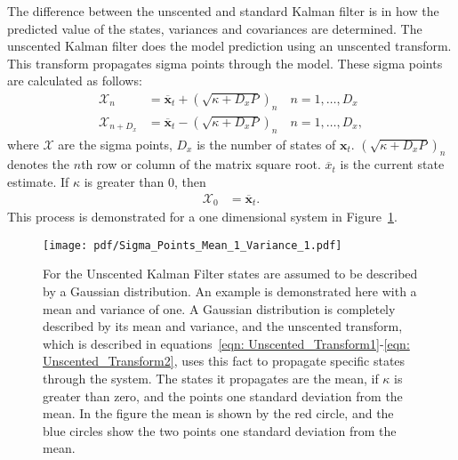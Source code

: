 The difference between the unscented and standard Kalman filter is in how the predicted value of the states, variances and covariances are determined. The unscented Kalman filter does the model prediction using an unscented transform. This transform propagates sigma points through the model. These sigma points are calculated as follows: \begin{align}
\label{eqn: Unscented_Transform1}
\mathbf{\mathcal{X}}_{n} &= \mathbf{\overline{x}}_{t} + (\sqrt{\kappa+D_{x}P})_{n} \quad n=1,\hdots,D_x\\
\label{eqn: Unscented_Transform2}
\mathbf{\mathcal{X}}_{n+D_{x}} &= \mathbf{\overline{x}}_{t} - (\sqrt{\kappa+D_{x}P})_{n} \quad n=1,\hdots,D_x,
\end{align} where $\mathbf{\mathcal{X}}$  are the sigma points, $D_{x}$ is the number of states of $\mathbf{x}_{t}$. $(\sqrt{\kappa+D_{x}P})_{n}$ denotes the $n$th row or column of the matrix square root. $\overline{x}_{t}$ is the current state estimate.
If $\kappa$ is greater than 0, then \begin{align}
\mathbf{\mathcal{X}}_{0} &= \mathbf{\overline{x}}_{t}.
\end{align} This process is demonstrated for a one dimensional system in Figure~\ref{fig: Sigma}.

\begin{figure}
	\centering
		\texttt{[image: pdf/Sigma\_Points\_Mean\_1\_Variance\_1.pdf]}
	\caption[Sigma Points]{For the Unscented Kalman Filter states are assumed to be described by a Gaussian distribution. An example is demonstrated here with a mean and variance of one. A Gaussian distribution is completely described by its mean and variance, and the unscented transform, which is described in equations~\ref{eqn: Unscented_Transform1}-\ref{eqn: Unscented_Transform2}, uses this fact to propagate specific states through the system. The states it propagates are the mean, if $\kappa$ is greater than zero, and the points one standard deviation from the mean. In the figure the mean is shown by the red circle, and the blue circles show the two points one standard deviation from the mean.}
	\label{fig: Sigma}
\end{figure}

